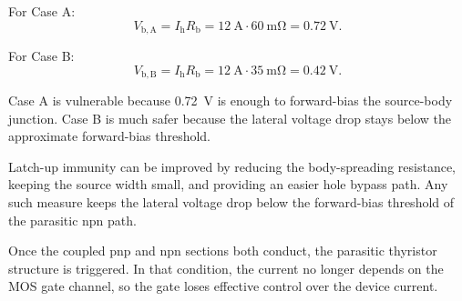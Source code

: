
\begin{solutionblock}
    For Case A:
    \begin{equation}
        V_\mathrm{b,A} = I_\mathrm{h} R_\mathrm{b}
        = \SI{12}{\ampere} \cdot \SI{60}{\milli\ohm}
        = \SI{0.72}{\volt}.
    \end{equation}

    For Case B:
    \begin{equation}
        V_\mathrm{b,B} = I_\mathrm{h} R_\mathrm{b}
        = \SI{12}{\ampere} \cdot \SI{35}{\milli\ohm}
        = \SI{0.42}{\volt}.
    \end{equation}
\end{solutionblock}


\begin{solutionblock}
    Case A is vulnerable because \SI{0.72}{\volt} is enough to forward-bias the source-body junction.
    Case B is much safer because the lateral voltage drop stays below the approximate forward-bias threshold.
\end{solutionblock}


\begin{solutionblock}
    Latch-up immunity can be improved by reducing the body-spreading resistance, keeping the source width small, and providing an easier hole bypass path.
    Any such measure keeps the lateral voltage drop below the forward-bias threshold of the parasitic npn path.
\end{solutionblock}


\begin{solutionblock}
    Once the coupled pnp and npn sections both conduct, the parasitic thyristor structure is triggered.
    In that condition, the current no longer depends on the MOS gate channel, so the gate loses effective control over the device current.
\end{solutionblock}




